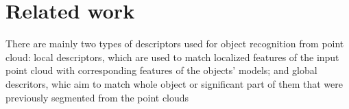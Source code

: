 
\chapter{Related work}
\label{chap:back}

There are mainly two types of descriptors used for object recognition from point cloud: local descriptors, which are used to match localized features of the input point cloud with corresponding features of the objects' models; and global descritors, whic aim to match whole object or significant part of them that were previously segmented from the point clouds
